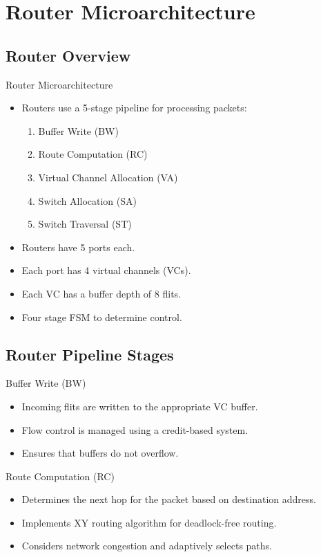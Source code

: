 \documentclass{beamer}
\begin{document}
\section{Router Microarchitecture}
\subsection{Router Overview}
\begin{frame}{Router Microarchitecture}
	\begin{itemize}
		\item Routers use a 5-stage pipeline for processing packets:
		\begin{enumerate}
			\item Buffer Write (BW)
			\item Route Computation (RC)
			\item Virtual Channel Allocation (VA)
			\item Switch Allocation (SA)
			\item Switch Traversal (ST)
		\end{enumerate}
		\item Routers have 5 ports each.
		\item Each port has 4 virtual channels (VCs).
		\item Each VC has a buffer depth of 8 flits.
		\item Four stage FSM to determine control.
	\end{itemize}
\end{frame}

\subsection{Router Pipeline Stages}
\begin{frame}{Buffer Write (BW)}
	\begin{itemize}
		\item Incoming flits are written to the appropriate VC buffer.
		\item Flow control is managed using a credit-based system.
		\item Ensures that buffers do not overflow.
	\end{itemize}
\end{frame}

\begin{frame}{Route Computation (RC)}
	\begin{itemize}
		\item Determines the next hop for the packet based on destination address.
		\item Implements XY routing algorithm for deadlock-free routing.
		\item Considers network congestion and adaptively selects paths.
	\end{itemize}
\end{frame}
\end{document}
